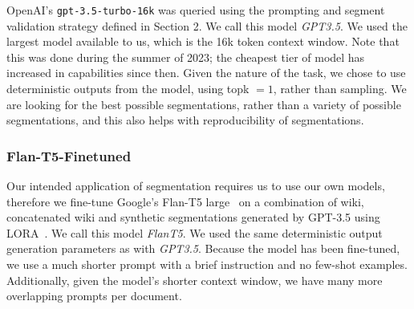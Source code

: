 OpenAI's \texttt{gpt-3.5-turbo-16k} was queried using the prompting and segment validation strategy defined in Section 2. We call this model \emph{GPT3.5}. We used the largest model available to us, which is the 16k token context window. Note that this was done during the summer of 2023; the cheapest tier of model has increased in capabilities since then. Given the nature of the task, we chose to use deterministic outputs from the model, using topk $=1$, rather than sampling. We are looking for the best possible segmentations, rather than a variety of possible segmentations, and this also helps with reproducibility of segmentations.

\subsubsection{Flan-T5-Finetuned}\label{FlanT5}

Our intended application of segmentation requires us to use our own models, therefore we fine-tune Google's Flan-T5 large~\citep{FlanT5} on a combination of wiki, concatenated wiki and synthetic segmentations generated by GPT-3.5 using LORA~\citep{LORA}. We call this model \emph{FlanT5}. We used the same deterministic output generation parameters as with \emph{GPT3.5}. Because the model has been fine-tuned, we use a much shorter prompt with a brief instruction and no few-shot examples. Additionally, given the model's shorter context window, we have many more overlapping prompts per document.